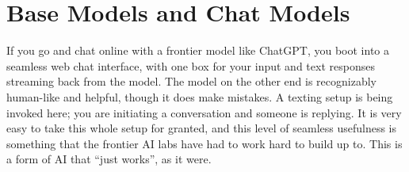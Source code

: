 \section{Base Models and Chat Models}
If you go and chat online with a frontier model like ChatGPT, you boot into a
seamless web chat interface, with one box for your input and text responses
streaming back from the model. The model on the other end is recognizably
human-like and helpful, though it does make mistakes. A texting setup is being
invoked here; you are initiating a conversation and someone is replying. It is
very easy to take this whole setup for granted, and this level of seamless
usefulness is something that the frontier AI labs have had to work hard to
build up to. This is a form of AI that ``just works'', as it were.

